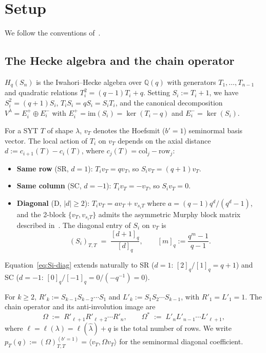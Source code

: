 \documentclass[11pt]{article}
\theoremstyle{definition}
\newcommand{\Hq}{H_q}
\newcommand{\Sn}{S_n}
\newcommand{\Vlam}{V^\lambda}
\newcommand{\Om}{\Omega}
\newcommand{\Omstar}{\Omega^{\ast}}
\newcommand{\hatl}{\widehat\lambda}
\newcommand{\Rp}{{R'}}
\newcommand{\Lp}{{L'}}
\newcommand{\elh}{\ell(\hatl)}
\newcommand{\Eplus}{E^+}
\newcommand{\Eminus}{E^-}
\newcommand{\im}{\mathrm{im}}
\newcommand{\pT}{p_T}
\newcommand{\qint}[1]{[#1]_q}
\begin{document}
\section{Setup}\label{sec:setup}

We follow the conventions of~\cite{dclassRowZero,leftmostPerSYT,survey}.

\subsection{The Hecke algebra and the chain operator}

$\Hq(\Sn)$ is the Iwahori--Hecke algebra over $\mathbb{Q}(q)$ with generators
$T_1, \ldots, T_{n-1}$ and quadratic relations
$T_i^2 = (q - 1) T_i + q$. Setting $S_i := T_i + 1$, we have
$S_i^2 = (q + 1) S_i$, $T_i S_i = q S_i = S_i T_i$, and the canonical
decomposition $\Vlam = \Eplus_i \oplus \Eminus_i$ with
$\Eplus_i = \im(S_i) = \ker(T_i - q)$ and $\Eminus_i = \ker(S_i)$.

For a SYT $T$ of shape $\lambda$, $v_T$ denotes the Hoefsmit ($b' \!=\! 1$)
seminormal basis vector. The local action of $T_i$ on $v_T$ depends on the
axial distance $d := c_{i+1}(T) - c_i(T)$, where $c_j(T) = \text{col}_j - \text{row}_j$:
\begin{itemize}[topsep=0.2em,itemsep=0.1em]
\item \textbf{Same row} (SR, $d = 1$): $T_i v_T = q v_T$, so $S_i v_T = (q+1) v_T$.
\item \textbf{Same column} (SC, $d = -1$): $T_i v_T = -v_T$, so $S_i v_T = 0$.
\item \textbf{Diagonal} (D, $|d| \ge 2$): $T_i v_T = a v_T + v_{s_i T}$
   where $a = (q-1) q^d / (q^d - 1)$, and the 2-block $\{v_T, v_{s_i T}\}$
   admits the asymmetric Murphy block matrix described
   in~\cite[\S 2]{leftmostPerSYT}. The diagonal entry of $S_i$ on $v_T$ is
   \begin{equation}\label{eq:Si-diag}
      (S_i)_{T,T} \;=\; \frac{\qint{d+1}}{\qint{d}},
      \qquad \qint{m} := \frac{q^m - 1}{q - 1}.
   \end{equation}
\end{itemize}
Equation~\eqref{eq:Si-diag} extends naturally to SR ($d = 1$:
$\qint{2}/\qint{1} = q+1$) and SC ($d = -1$: $\qint{0}/\qint{-1} =
0/(-q^{-1}) = 0$).

For $k \ge 2$, $\Rp_k := S_{k-1} S_{k-2} \cdots S_1$ and $\Lp_k := S_1 S_2
\cdots S_{k-1}$, with $\Rp_1 = \Lp_1 = 1$. The chain operator and its
anti-involution image are
\begin{equation}\label{eq:omega-def}
   \Om \;:=\; \Rp_{\ell+1} \Rp_{\ell+2} \cdots \Rp_n,
   \qquad
   \Omstar \;:=\; \Lp_n \Lp_{n-1} \cdots \Lp_{\ell+1},
\end{equation}
where $\ell = \ell(\lambda) = \elh + q$ is the total number of rows.
We write $\pT(q) := (\Om)_{T,T}^{(b'=1)} = \langle v_T, \Om v_T \rangle$
for the seminormal diagonal coefficient.
\end{document}
